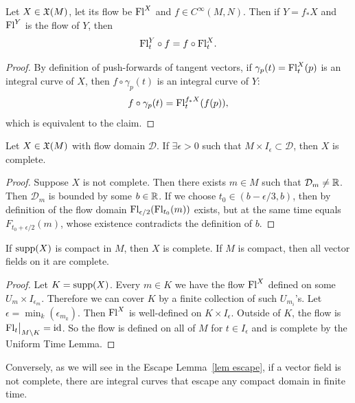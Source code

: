 \begin{cor}\label{cor naturality of flows}
    Let $X\in\mathfrak{X}(M)$, let its flow be $\mathrm{Fl}^X$ and $f\in C^\infty(M,N)$. Then if $Y=f_\ast X$ and $\mathrm{Fl}^Y$ is the flow of $Y$, then 
    \[\mathrm{Fl}^Y_t\circ f=f\circ \mathrm{Fl}^X_t.\]
\end{cor}
\begin{proof}
    By definition of push-forwards of tangent vectors, if $\gamma_p(t)=\mathrm{Fl}_t^X(p)$ is an integral curve of $X$, then $f\circ \gamma_p(t)$ is an integral curve of $Y$:
    \[f\circ \gamma_p(t)=\mathrm{Fl}^{f_\ast X}_t(f(p)),\]
    which is equivalent to the claim.
\end{proof}

\begin{thm}\label{lem uniform time}
    Let $X\in\mathfrak{X}(M)$ with flow domain $\mathcal{D}$. If $\exists\epsilon>0$ such that $M\times I_\epsilon\subset\mathcal{D}$, then $X$ is complete.
\end{thm}
\begin{proof}
    Suppose $X$ is not complete. Then there exists $m\in M$ such that $\mathcal{D}_m\neq \mathbb{R} $. Then $\mathcal{D}_m$ is bounded by some $b\in\mathbb{R} $. If we choose $t_0\in(b-\epsilon/3,b)$, then by definition of the flow domain $\mathrm{Fl}_{\epsilon/2}(\mathrm{Fl}_{t_0}(m))$ exists, but at the same time equals $F_{t_0+\epsilon/2}(m)$, whose existence contradicts the definition of $b$.
\end{proof}
\begin{cor}
    If $\operatorname{supp} (X)$ is compact in $M$, then $X$ is complete. If $M$ is compact, then all vector fields on it are complete.
\end{cor}
\begin{proof}
    Let $K=\operatorname{supp}(X)$. Every $m\in K$ we have the flow $\mathrm{Fl}^X$ defined on some $U_m\times I_{\epsilon_m}$. Therefore we can cover $K$ by a finite collection of such $U_{m_i}$'s. Let $\epsilon=\min_k(\epsilon_{m_k})$. Then $\mathrm{Fl}^X$ is well-defined on $K\times I_\epsilon$. Outside of $K$, the flow is $\restr{\Fl_t}{M\setminus K}=\id$. So the flow is defined on all of $M$ for $t\in I_\epsilon$ and is complete by the Uniform Time Lemma.
\end{proof}

Conversely, as we will see in the Escape Lemma~\ref{lem escape}, if a vector field is not complete, there are integral curves that escape any compact domain in finite time.


